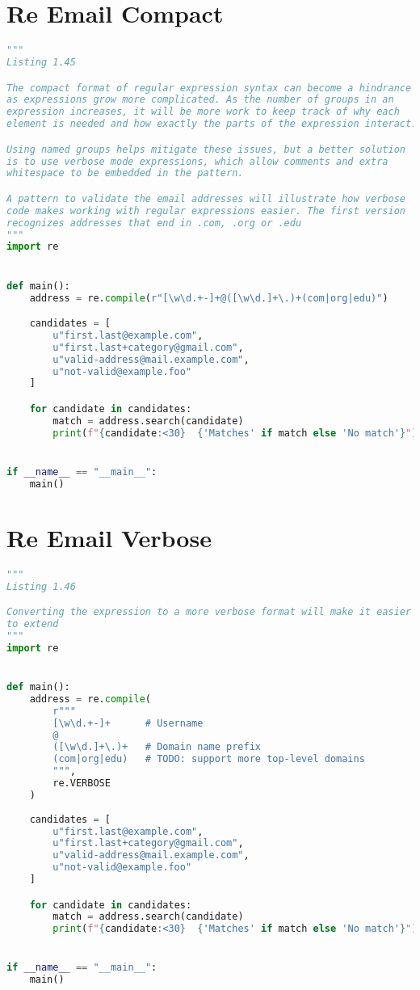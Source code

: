 \documentclass[a4paper,landscape]{report}
\begin{document}
\section{Re Email Compact}
\begin{lstlisting}[language=Python]
"""
Listing 1.45

The compact format of regular expression syntax can become a hindrance
as expressions grow more complicated. As the number of groups in an
expression increases, it will be more work to keep track of why each
element is needed and how exactly the parts of the expression interact.

Using named groups helps mitigate these issues, but a better solution
is to use verbose mode expressions, which allow comments and extra
whitespace to be embedded in the pattern.

A pattern to validate the email addresses will illustrate how verbose
code makes working with regular expressions easier. The first version
recognizes addresses that end in .com, .org or .edu
"""
import re


def main():
    address = re.compile(r"[\w\d.+-]+@([\w\d.]+\.)+(com|org|edu)")

    candidates = [
        u"first.last@example.com",
        u"first.last+category@gmail.com",
        u"valid-address@mail.example.com",
        u"not-valid@example.foo"
    ]

    for candidate in candidates:
        match = address.search(candidate)
        print(f"{candidate:<30}  {'Matches' if match else 'No match'}")


if __name__ == "__main__":
    main()

\end{lstlisting}
\section{Re Email Verbose}
\begin{lstlisting}[language=Python]
"""
Listing 1.46

Converting the expression to a more verbose format will make it easier
to extend
"""
import re


def main():
    address = re.compile(
        r"""
        [\w\d.+-]+      # Username
        @
        ([\w\d.]+\.)+   # Domain name prefix
        (com|org|edu)   # TODO: support more top-level domains
        """,
        re.VERBOSE
    )
    
    candidates = [
        u"first.last@example.com",
        u"first.last+category@gmail.com",
        u"valid-address@mail.example.com",
        u"not-valid@example.foo"
    ]

    for candidate in candidates:
        match = address.search(candidate)
        print(f"{candidate:<30}  {'Matches' if match else 'No match'}")


if __name__ == "__main__":
    main()

\end{lstlisting}
\end{document}
